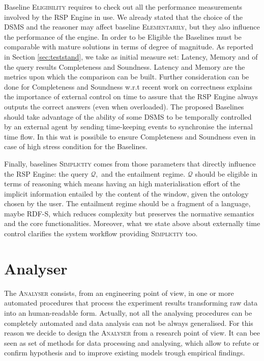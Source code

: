 Baseline \textsc{Eligibility} requires to check out all the performance measurements involved by the RSP Engine in use. We already stated that the choice of the DSMS and the reasoner may affect baseline \textsc{Elementarily}, but they also influence the performance of the engine. In order to be Eligible the Baselines must be comparable with mature solutions in terms of degree of magnitude. As reported in Section \ref{sec:teststand}, we take as initial measure set: Latency, Memory and of the query results Completeness and Soundness. Latency and Memory are the metrics upon which the comparison can be built. Further consideration can be done for Completeness and Soundness w.r.t recent work on correctness \cite{DBLP:conf/semweb/DellAglioCBCV13}  \cite{DBLP:conf/semweb/DellAglioCBCV13} explains the importance of external control on time to assure that the RSP Engine always outputs the correct answers (even when overloaded). The proposed Baselines should take advantage of the ability of some DSMS to be temporally controlled by an external agent by sending time-keeping events to synchronise the internal time flow. In this wat is possibile to ensure Completeness and Soundness even in case of high stress condition for the Baselines. %

Finally, baselines \textsc{Simplicity} comes from those parameters that directly influence the RSP Engine: the query $\mathcal{Q},$ and the entailment regime. $\mathcal{Q}$ should be eligible in terms of reasoning which means having an high materialisation effort of the implicit information entailed by the content of the window, given the ontology chosen by the user. The entailment regime should be a fragment of a language, maybe RDF-S, which reduces complexity but preserves the normative semantics and the core functionalities. Moreover, what we state above about externally time control clarifies the system workflow providing \textsc{Simplicity} too.

\section{Analyser}\label{sec:analyser}

The \textsc{Analyser} consists, from an engineering point of view, in one or more automated procedures that process the experiment results transforming raw data into an human-readable form. Actually, not all the analysing procedures can be completely automated and data analysis can not be always generalised. For this reason we decide to design the \textsc{Analyser} from a research point of view. It can bee seen as set of methods for data processing and analysing, which allow to refute or confirm hypothesis and to improve existing models trough empirical findings.

